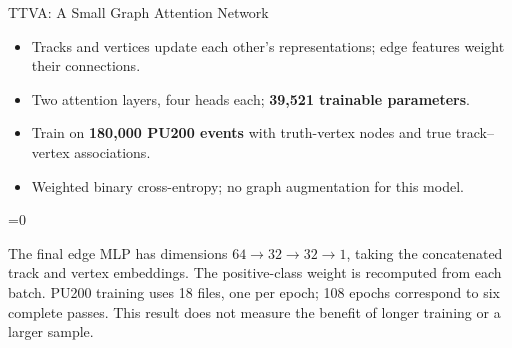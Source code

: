 \documentclass[xcolor=table,aspectratio=169]{beamer}
\providecommand{\talkbuild}{0}
\newcommand{\readingonly}[1]{\ifnum\talkbuild=0\relax#1\fi}
\newcommand{\readingnote}[1]{\readingonly{\par\vspace{.35em}%
  {\footnotesize\color{black!65}#1\par}}}
\begin{document}
\begin{frame}{TTVA: A Small Graph Attention Network}
\relax

\centering
{}
\par\vspace{1.3em}
\begin{itemize}\setlength\itemsep{.6em}\small
\item Tracks and vertices update each other's representations; edge features weight their connections.
\item Two attention layers, four heads each; \textbf{39,521 trainable parameters}.
\item Train on \textbf{180,000 PU200 events} with truth-vertex nodes and true track--vertex associations.
\item Weighted binary cross-entropy; no graph augmentation for this model.
\end{itemize}
\readingnote{The final edge MLP has dimensions $64\to32\to32\to1$, taking the concatenated track and vertex embeddings. The positive-class weight is recomputed from each batch. PU200 training uses 18 files, one per epoch; 108 epochs correspond to six complete passes. This result does not measure the benefit of longer training or a larger sample.}
\end{frame}
\end{document}
